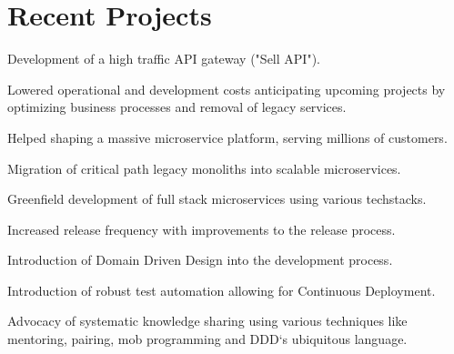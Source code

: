\documentclass[]{resume}
\begin{document}
\hfill
\begin{minipage}[t]{0.64\textwidth} 


\section{Recent Projects}

\vspace{\topsep} %
\begin{tightemize}\item Development of a high traffic API gateway ("Sell API").
\end{tightemize}
\sectionsep

\begin{tightemize}\item Lowered operational and development costs anticipating upcoming projects by optimizing business processes and removal of legacy services.
\end{tightemize}
\sectionsep

\begin{tightemize}
\item Helped shaping a massive microservice platform, serving millions of customers.
\item Migration of critical path legacy monoliths into scalable microservices.
\item Greenfield development of full stack microservices using various techstacks.
\item Increased release frequency with improvements to the release process.
\item Introduction of Domain Driven Design into the development process.
\item Introduction of robust test automation allowing for Continuous Deployment.
\item Advocacy of systematic knowledge sharing using various techniques like mentoring, pairing, mob programming and DDD`s ubiquitous language.
\end{tightemize}
\sectionsep


\end{minipage}
\end{document}
